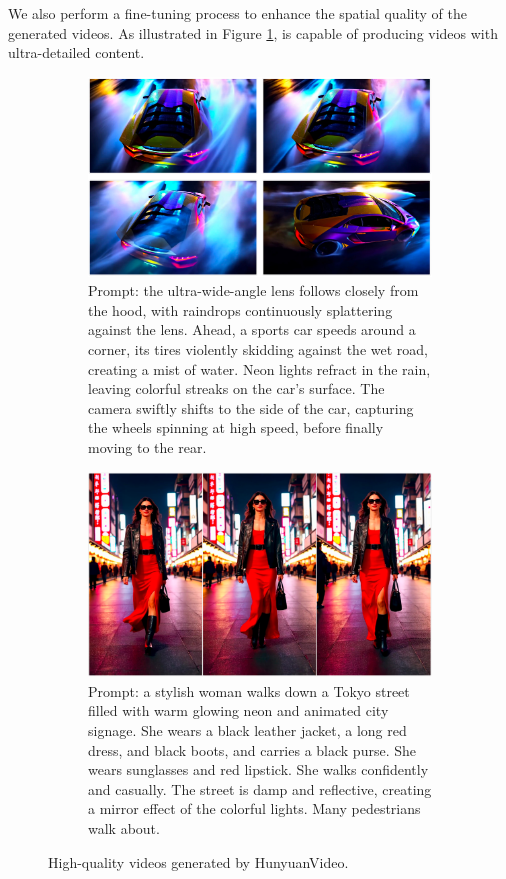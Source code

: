 
We also perform a fine-tuning process to enhance the spatial quality of the generated videos. As illustrated in Figure \ref{fig:high_quality}, \nameofmethod{} is capable of producing videos with ultra-detailed content.
\begin{figure}[!htbp]
    \centering
    \begin{subfigure}{\textwidth}
        \centering
        \includegraphics[width=\textwidth]{figures/high-quality-1.png}
        \caption{Prompt: the ultra-wide-angle lens follows closely from the hood, with raindrops continuously splattering against the lens. Ahead, a sports car speeds around a corner, its tires violently skidding against the wet road, creating a mist of water. Neon lights refract in the rain, leaving colorful streaks on the car's surface. The camera swiftly shifts to the side of the car, capturing the wheels spinning at high speed, before finally moving to the rear.}
    \end{subfigure}
    \hfill
    \begin{subfigure}{\textwidth}
        \centering
        \includegraphics[width=\textwidth]{figures/high-quality-2.png}
        \caption{Prompt: a stylish woman walks down a Tokyo street filled with warm glowing neon and animated city signage. She wears a black leather jacket, a long red dress, and black boots, and carries a black purse. She wears sunglasses and red lipstick. She walks confidently and casually. The street is damp and reflective, creating a mirror effect of the colorful lights. Many pedestrians walk about.}
    \end{subfigure}
    \caption{High-quality videos generated by HunyuanVideo.}
    \label{fig:high_quality}
\end{figure}

